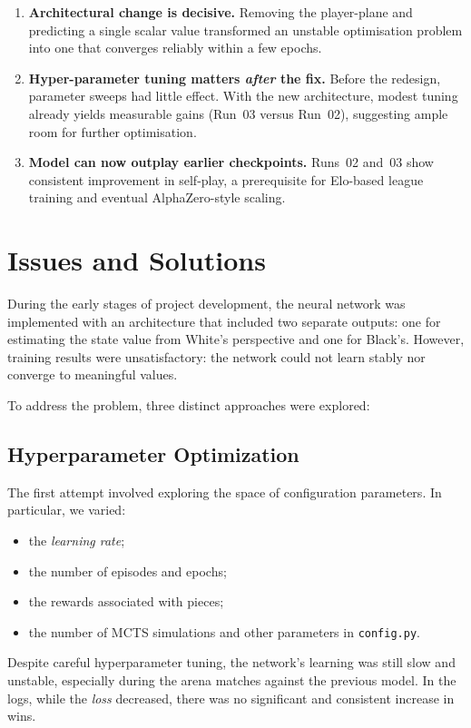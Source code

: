 \documentclass{report}
\begin{document}
\begin{enumerate}
  \item \textbf{Architectural change is decisive.}  
        Removing the player-plane and predicting a single scalar value
        transformed an unstable optimisation problem into one that converges
        reliably within a few epochs.
  \item \textbf{Hyper-parameter tuning matters \emph{after} the fix.}  
        Before the redesign, parameter sweeps had little effect.  
        With the new architecture, modest tuning already yields measurable
        gains (Run~03 versus Run~02), suggesting ample room for further
        optimisation.
  \item \textbf{Model can now outplay earlier checkpoints.}  
        Runs~02 and~03 show consistent improvement in self-play, a
        prerequisite for Elo-based league training and eventual
        AlphaZero-style scaling.
\end{enumerate}
\chapter{Issues and Solutions}

During the early stages of project development, the neural network was implemented with an architecture that included two separate outputs: one for estimating the state value from White’s perspective and one for Black’s. However, training results were unsatisfactory: the network could not learn stably nor converge to meaningful values.

To address the problem, three distinct approaches were explored:

\section{Hyperparameter Optimization}
The first attempt involved exploring the space of configuration parameters. In particular, we varied:
\begin{itemize}
    \item the \textit{learning rate};
    \item the number of episodes and epochs;
    \item the rewards associated with pieces;
    \item the number of MCTS simulations and other parameters in \texttt{config.py}.
\end{itemize}
Despite careful hyperparameter tuning, the network’s learning was still slow and unstable, especially during the arena matches against the previous model. In the logs, while the \textit{loss} decreased, there was no significant and consistent increase in wins.
\end{document}
